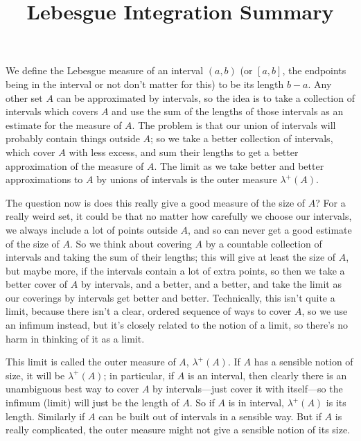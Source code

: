 \documentclass{article}
\begin{document}
\title{Lebesgue Integration Summary}
\date{}

\maketitle
\thispagestyle{empty}

\Large


We define the Lebesgue measure of an interval $(a,b)$ (or $[a,b]$, the endpoints being in the interval or not don't matter for this) to be its length $b-a$. Any other set $A$ can be approximated by intervals, so the idea is to take a collection of intervals which covers $A$ and use the sum of the lengths of those intervals as an estimate for the measure of $A$. The problem is that our union of intervals will probably contain things outside $A$; so we take a better collection of intervals, which cover $A$ with less excess, and sum their lengths to get a better approximation of the measure of $A$. The limit as we take better and better approximations to $A$ by unions of intervals is the outer measure $\lambda^+(A)$.

The question now is does this really give a good measure of the size of $A$? For a really weird set, it could be that no matter how carefully we choose our intervals, we always include a lot of points outside $A$, and so can never get a good estimate of the size of $A$. So we think about covering $A$ by a countable collection of intervals and taking the sum of their lengths; this will give at least the size of $A$, but maybe more, if the intervals contain a lot of extra points, so then we take a better cover of $A$ by intervals, and a better, and a better, and take the limit as our coverings by intervals get better and better. Technically, this isn't quite a limit, because there isn't a clear, ordered sequence of ways to cover $A$, so we use an infimum instead, but it's closely related to the notion of a limit, so there's no harm in thinking of it as a limit.

This limit is called the outer measure of $A$, $\lambda^+(A)$. If $A$ has a sensible notion of size, it will be $\lambda^+(A)$; in particular, if $A$ is an interval, then clearly there is an unambiguous best way to cover $A$ by intervals---just cover it with itself---so the infimum (limit) will just be the length of $A$. So if $A$ is in interval, $\lambda^+(A)$ is its length. Similarly if $A$ can be built out of intervals in a sensible way. But if $A$ is really complicated, the outer measure might not give a sensible notion of its size.
\end{document}
